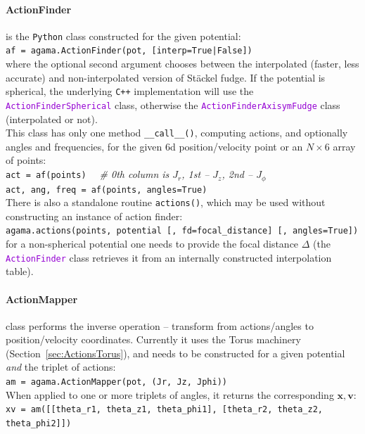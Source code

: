 \documentclass[12pt]{article}
\newcommand{\Cpp}  {\texttt{C++}\xspace}
\newcommand{\Python}{\texttt{Python}\xspace}
\newcommand{\ttt}[1]{\textcolor{darkviolet}{\texttt{#1}}}
\newcommand{\bv}{\boldsymbol{v}}
\newcommand{\bx}{\boldsymbol{x}}
\begin{document}
\paragraph{ActionFinder} is the \Python class constructed for the given potential:\\
\texttt{af = agama.ActionFinder(pot, [interp=True|False])}\\
where the optional second argument chooses between the interpolated (faster, less accurate) and non-interpolated version of St\"ackel fudge. If the potential is spherical, the underlying \Cpp implementation will use the \ttt{ActionFinderSpherical} class, otherwise the \ttt{ActionFinderAxisymFudge} class (interpolated or not).\\
This class has only one method \texttt{__call__()}, computing actions, and optionally angles and frequencies, for the given 6d position/velocity point or an $N\times6$ array of points:\\[1mm]
\texttt{act = af(points)}
\textit{\color{Sepia}\ \ \# 0th column is $J_r$, 1st -- $J_z$, 2nd -- $J_\phi$} \\
\texttt{act, ang, freq = af(points, angles=True)}\\[2mm]
There is also a standalone routine \texttt{actions()}, which may be used without constructing an instance of action finder:\\[1mm]
\texttt{agama.actions(points, potential [, fd=focal_distance] [, angles=True])}\\[1mm]
for a non-spherical potential one needs to provide the focal distance $\Delta$ (the \ttt{ActionFinder} class retrieves it from an internally constructed interpolation table).

\paragraph{ActionMapper} class performs the inverse operation -- transform from actions/angles to position/velocity coordinates. Currently it uses the Torus machinery (Section~\ref{sec:ActionsTorus}), and needs to be constructed for a given potential \textit{and} the triplet of actions:\\[1mm]
\texttt{am = agama.ActionMapper(pot, (Jr, Jz, Jphi))}\\[2mm]
When applied to one or more triplets of angles, it returns the corresponding $\bx,\bv$:\\[1mm]
\texttt{xv = am([[theta_r1, theta_z1, theta_phi1], [theta_r2, theta_z2, theta_phi2]])}
\end{document}
